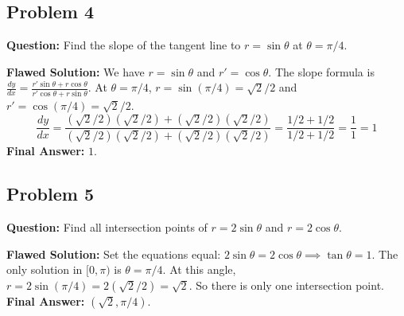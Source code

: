\documentclass{article}
\begin{document}
\subsection{Problem 4}
\textbf{Question:} Find the slope of the tangent line to $r = \sin\theta$ at $\theta = \pi/4$.

\textbf{Flawed Solution:}
We have $r = \sin\theta$ and $r' = \cos\theta$.
The slope formula is $\frac{dy}{dx} = \frac{r' \sin\theta + r \cos\theta}{r' \cos\theta + r \sin\theta}$.
At $\theta = \pi/4$, $r = \sin(\pi/4) = \sqrt{2}/2$ and $r' = \cos(\pi/4) = \sqrt{2}/2$.
\[ \frac{dy}{dx} = \frac{(\sqrt{2}/2)(\sqrt{2}/2) + (\sqrt{2}/2)(\sqrt{2}/2)}{(\sqrt{2}/2)(\sqrt{2}/2) + (\sqrt{2}/2)(\sqrt{2}/2)} = \frac{1/2 + 1/2}{1/2 + 1/2} = \frac{1}{1} = 1 \]
\textbf{Final Answer:} $1$.

\subsection{Problem 5}
\textbf{Question:} Find all intersection points of $r = 2\sin\theta$ and $r = 2\cos\theta$.

\textbf{Flawed Solution:}
Set the equations equal: $2\sin\theta = 2\cos\theta \implies \tan\theta = 1$.
The only solution in $[0, \pi)$ is $\theta = \pi/4$.
At this angle, $r = 2\sin(\pi/4) = 2(\sqrt{2}/2) = \sqrt{2}$.
So there is only one intersection point.
\textbf{Final Answer:} $(\sqrt{2}, \pi/4)$.
\end{document}
